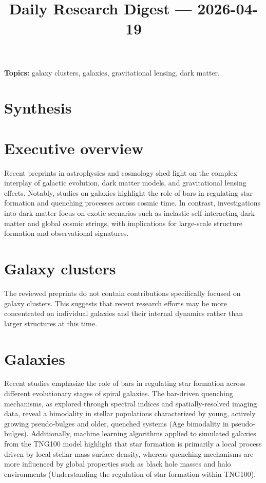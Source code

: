 \documentclass[11pt]{article}
\begin{document}
\title{Daily Research Digest --- 2026-04-19}
\author{}
\date{}
\maketitle
\textbf{Topics:} galaxy clusters, galaxies, gravitational lensing, dark matter.
\section*{Synthesis}
\section*{Executive overview}
Recent preprints in astrophysics and cosmology shed light on the complex interplay of galactic evolution, dark matter models, and gravitational lensing effects. Notably, studies on galaxies highlight the role of bars in regulating star formation and quenching processes across cosmic time. In contrast, investigations into dark matter focus on exotic scenarios such as inelastic self-interacting dark matter and global cosmic strings, with implications for large-scale structure formation and observational signatures.
\section*{Galaxy clusters}
The reviewed preprints do not contain contributions specifically focused on galaxy clusters. This suggests that recent research efforts may be more concentrated on individual galaxies and their internal dynamics rather than larger structures at this time.
\section*{Galaxies}
Recent studies emphasize the role of bars in regulating star formation across different evolutionary stages of spiral galaxies. The bar-driven quenching mechanisms, as explored through spectral indices and spatially-resolved imaging data, reveal a bimodality in stellar populations characterized by young, actively growing pseudo-bulges and older, quenched systems (Age bimodality in pseudo-bulges). Additionally, machine learning algorithms applied to simulated galaxies from the TNG100 model highlight that star formation is primarily a local process driven by local stellar mass surface density, whereas quenching mechanisms are more influenced by global properties such as black hole masses and halo environments (Understanding the regulation of star formation within TNG100).
\end{document}
